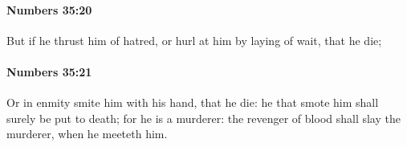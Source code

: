 		\paragraph{Numbers 35:20} %
			\label{NUMBERS-35-20}

			But if he thrust him of hatred, or hurl at him by laying of wait, that he die;


		\paragraph{Numbers 35:21} %
			\label{NUMBERS-35-21}

			Or in enmity smite him with his hand, that he die: he that smote him shall surely be put to death; for he is a murderer: the revenger of blood shall slay the murderer, when he meeteth him.


